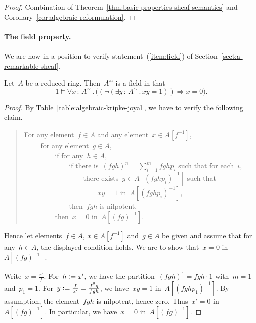\documentclass{ws-rv9x6}
\newcommand{\defeq}{\vcentcolon=}
\renewcommand{\_}{\mathpunct{.}}
\newcommand{\?}{\,{:}\,}
\begin{document}
\begin{proof}Combination of Theorem~\ref{thm:basic-properties-sheaf-semantics}
and Corollary~\ref{cor:algebraic-reformulation}.\end{proof}


\paragraph{The field property.} We are now in a position to verify
statement~(\ref{item:field}) of Section~\ref{sect:a-remarkable-sheaf}.

\begin{proposition}\label{prop:field-property}
Let~$A$ be a reduced ring. Then~$A^\sim$ is a field in that
\[ 1 \models \forall x\?A^\sim\_ \bigl((\neg(\exists y\?A^\sim\_ xy = 1)) \Rightarrow
x = 0\bigr). \]
\end{proposition}

\begin{proof}By Table~\ref{table:algebraic-kripke-joyal}, we have to verify the
following claim.
\begin{quote}
For any element~$f \in A$ and any element~$x \in A[f^{-1}]$, \\
${\qquad}$ for any element~$g \in A$, \\
${\qquad\qquad}$ if for any~$h \in A$, \\
${\qquad\qquad\qquad}$ if there is~$(fgh)^n = \sum_{i=1}^m fghp_i$
such that for each~$i$, \\
${\qquad\qquad\qquad\qquad}$ there exists~$y \in
A[(fghp_i)^{-1}]$ such that \\
${\qquad\qquad\qquad\qquad\qquad}$ $xy = 1$ in~$A[(fghp_i)^{-1}]$, \\
${\qquad\qquad\qquad}$ then~$fgh$ is nilpotent, \\
${\qquad\qquad}$ then~$x = 0$ in~$A[(fg)^{-1}]$.
\end{quote}
Hence let elements~$f \in A$, $x \in A[f^{-1}]$ and~$g \in A$ be given and
assume that for any~$h \in A$, the displayed condition holds. We are to show
that~$x = 0$ in~$A[(fg)^{-1}]$.

Write~$x = \frac{x'}{f}$. For~$h \defeq x'$, we have the
partition~$(fgh)^1 = fgh \cdot 1$ with~$m = 1$ and~$p_1 = 1$. For~$y \defeq
\frac{f}{x'} = \frac{f^2g}{fgh}$, we have~$xy = 1$ in~$A[(fghp_1)^{-1}]$.
By assumption, the element~$fgh$ is nilpotent, hence zero. Thus~$x' = 0$
in~$A[(fg)^{-1}]$. In particular, we have~$x = 0$ in~$A[(fg)^{-1}]$.
\end{proof}
\end{document}
